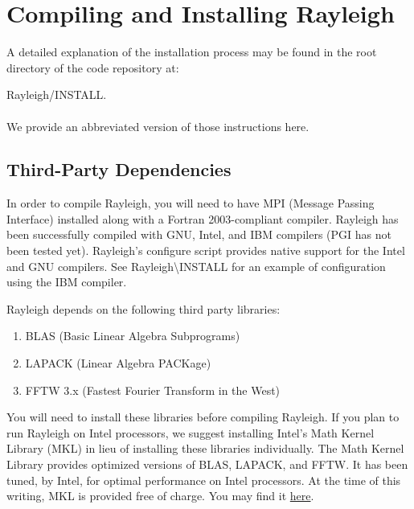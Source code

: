 \clearpage
\section{Compiling and Installing Rayleigh}\label{sec:installation}
A detailed explanation of the installation process may be found in the root directory of the code repository at: 

Rayleigh/INSTALL.
\\
\\
\noindent We provide an abbreviated version of those instructions here.

\subsection{Third-Party Dependencies}
In order to compile Rayleigh, you will need to have MPI (Message Passing Interface) installed along with  a Fortran 2003-compliant compiler.   Rayleigh has been successfully compiled with GNU, Intel, and IBM compilers (PGI has not been tested yet).  Rayleigh's configure script provides native support for the Intel and GNU compilers.   See Rayleigh\textbackslash INSTALL for an example of configuration using the IBM compiler.

Rayleigh depends on the following third party libraries:
\begin{enumerate}
\item BLAS (Basic Linear Algebra Subprograms)
\item LAPACK (Linear Algebra PACKage)
\item FFTW 3.x (Fastest Fourier Transform in the West)
\end{enumerate}

You will need to install these libraries before compiling Rayleigh.   If you plan to run Rayleigh on Intel processors, we suggest installing Intel's Math Kernel Library (MKL) in lieu of installing these libraries individually.  The Math Kernel Library provides optimized versions of BLAS, LAPACK, and FFTW.  It has been tuned, by Intel, for optimal performance on Intel processors.   At the time of this writing, MKL is provided free of charge.  You may find it {\color{blue} \href{https://software.intel.com/en-us/mkl}{here}}.

